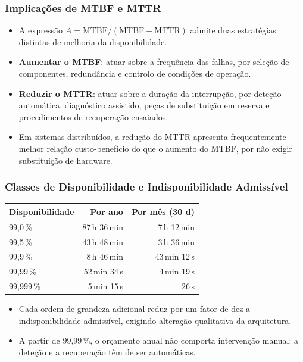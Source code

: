\documentclass[aspectratio=169]{beamer}
\begin{document}
\begin{frame}
\frametitle{Implicações de MTBF e MTTR}
\begin{itemize}
    \setlength\itemsep{0.35cm}
    \item A expressão $A = \mathrm{MTBF}/(\mathrm{MTBF}+\mathrm{MTTR})$ admite duas estratégias distintas de melhoria da disponibilidade.
    \item \textbf{Aumentar o MTBF}: atuar sobre a frequência das falhas, por seleção de componentes, redundância e controlo de condições de operação.
    \item \textbf{Reduzir o MTTR}: atuar sobre a duração da interrupção, por deteção automática, diagnóstico assistido, peças de substituição em reserva e procedimentos de recuperação ensaiados.
    \item Em sistemas distribuídos, a redução do MTTR apresenta frequentemente melhor relação custo-benefício do que o aumento do MTBF, por não exigir substituição de hardware.
\end{itemize}
\end{frame}

\begin{frame}
\frametitle{Classes de Disponibilidade e Indisponibilidade Admissível}
\vspace{0.2cm}
\begin{center}
\begin{tabular}{@{}lrr@{}}
\toprule
\textbf{Disponibilidade} & \textbf{Por ano} & \textbf{Por mês (30 d)} \\
\midrule
99{,}0\,\%    & 87\,h 36\,min   & 7\,h 12\,min  \\
99{,}5\,\%    & 43\,h 48\,min   & 3\,h 36\,min  \\
99{,}9\,\%    & 8\,h 46\,min    & 43\,min 12\,s \\
99{,}99\,\%   & 52\,min 34\,s   & 4\,min 19\,s  \\
99{,}999\,\%  & 5\,min 15\,s    & 26\,s         \\
\bottomrule
\end{tabular}
\end{center}
\vspace{0.3cm}
\begin{itemize}
    \setlength\itemsep{0.25cm}
    \item Cada ordem de grandeza adicional reduz por um fator de dez a indisponibilidade admissível, exigindo alteração qualitativa da arquitetura.
    \item A partir de 99{,}99\,\%, o orçamento anual não comporta intervenção manual: a deteção e a recuperação têm de ser automáticas.
\end{itemize}
\end{frame}
\end{document}
